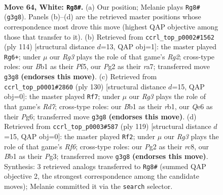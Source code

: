 \documentclass[11pt]{article}
\begin{document}
\clearpage

\begin{figure}[p]\centering
\begin{subfigure}{0.46\textwidth}\centering
\resizebox{\linewidth}{!}{%
\newchessgame
\chessboard[
  setfen={7k/8/4Q3/8/7P/6R1/5KP1/1B6 w - - 5 64},
  showmover=false,
  pgfstyle=straightmove, color=movearrow, markmove={g3-g8}
]}
\caption{}
\end{subfigure}\hfill
\begin{subfigure}{0.46\textwidth}\centering
\resizebox{\linewidth}{!}{%
\newchessgame
\chessboard[
  setfen={8/r7/7k/4KP2/8/8/6RP/8 w - - 1 58},
  showmover=false,
  pgfstyle=straightmove, color=movearrow, markmove={g2-g6}
]}
\caption{}
\end{subfigure}
\\[4pt]
\begin{subfigure}{0.46\textwidth}\centering
\resizebox{\linewidth}{!}{%
\newchessgame
\chessboard[
  setfen={6k1/3R4/6P1/6K1/6P1/8/8/1r6 w - - 13 66},
  showmover=false,
  pgfstyle=straightmove, color=movearrow, markmove={d7-f7}
]}
\caption{}
\end{subfigure}\hfill
\begin{subfigure}{0.46\textwidth}\centering
\resizebox{\linewidth}{!}{%
\newchessgame
\chessboard[
  setfen={2R5/8/4p3/4k3/8/5rp1/8/6K1 b - - 9 60},
  showmover=false,
  pgfstyle=straightmove, color=movearrow, markmove={f3-f2}
]}
\caption{}
\end{subfigure}
\caption{\textbf{Move 64, White: \texttt{Rg8\#}.} (a) Our position; Melanie plays \texttt{Rg8\#} (\texttt{g3g8}). Panels (b)--(d) are the retrieved master positions whose correspondence most drove this move (highest QAP objective among those that transfer to it). (b) Retrieved from \texttt{ccrl\_top\_p0002\#1562} (ply 114) [structural distance $d$=13, QAP obj=1]: the master played \texttt{Rg6+}; under $\mu$ our \emph{Rg3} plays the role of that game's \emph{Rg2}; cross-type roles: our \emph{B}b1 as their \emph{P}f5, our \emph{P}g2 as their \emph{r}a7; transferred move \texttt{g3g8} \textbf{(endorses this move)}. (c) Retrieved from \texttt{ccrl\_top\_p0001\#2860} (ply 130) [structural distance $d$=15, QAP obj=0]: the master played \texttt{Rf7}; under $\mu$ our \emph{Rg3} plays the role of that game's \emph{Rd7}; cross-type roles: our \emph{B}b1 as their \emph{r}b1, our \emph{Q}e6 as their \emph{P}g6; transferred move \texttt{g3g8} \textbf{(endorses this move)}. (d) Retrieved from \texttt{ccrl\_top\_p0003\#587} (ply 119) [structural distance $d$=15, QAP obj=0]: the master played \texttt{Rf2}; under $\mu$ our \emph{Rg3} plays the role of that game's \emph{Rf6}; cross-type roles: our \emph{P}g2 as their \emph{r}c8, our \emph{B}b1 as their \emph{P}g3; transferred move \texttt{g3g8} \textbf{(endorses this move)}. Synthesis: 3 retrieved analogs transferred to \texttt{Rg8\#} (summed QAP objective 2, the strongest correspondence among the candidate moves); Melanie committed it via the \texttt{search} selector.}
\label{fig:thought-m126}
\end{figure}
\end{document}
